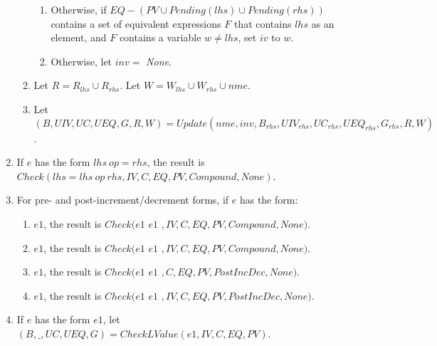 \begin{enumerate}
\begin{enumerate}
\begin{enumerate}
\item Otherwise, if $EQ - (PV \cup Pending(lhs) \cup Pending(rhs))$ contains a set of equivalent expressions $F$ that contains $lhs$ as 
an element, and $F$ contains a variable $w \neq lhs$, set $iv$ to $w$.
\item Otherwise, let $inv = $ {\it None}.
\end{enumerate}
\item Let $R = R_{lhs} \cup R_{rhs}$.  Let $W = W_{lhs} \cup W_{rhs} \cup nme$.
\item Let $(B, UIV, \mathit{UC}, UEQ, G, R, W) = Update(nme, inv, B_{rhs}, \mathit{UIV}_{rhs}, 
                                                                         \mathit{UC}_{rhs}, UEQ_{rhs}, G_{rhs}, R, W)$.
\end{enumerate}


\item If $e$ has the form $lhs~op= rhs$, the result is 
$Check(lhs = lhs~op~rhs, IV, C, EQ, PV, Compound, None)$.

\item For pre- and post-increment/decrement forms, if $e$ has the form:
\begin{enumerate}
\item \code{++}$e1$, the result is  $Check(e1$ \code{ = } $e1$ $, IV, C, EQ, PV,
Compound, None)$.
\item \code{--}$e1$, the result is $Check(e1$ \code{ = } $e1$ $, IV, C, EQ, PV,
Compound, None)$.
\item $e1$\code{++}, the result is  $Check(e1$ \code{ = } $ e1$ $,
C, EQ, PV, PostIncDec, None)$.
\item $e1$\code{--}, the result is $Check(e1$ \code{ = } $ e1$ $, IV, C, EQ, PV,
        PostIncDec, None)$.
\end{enumerate}
\item If $e$ has the form \code{&}$e1$, let $(B, \_, \mathit{UC}, UEQ, G) = CheckLValue(e1, IV, C, EQ, PV)$.
      

\end{enumerate}
